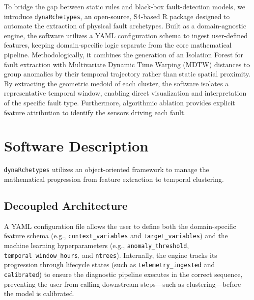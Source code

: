 \documentclass[final,3p,times]{elsarticle}
\begin{document}
To bridge the gap between static rules and black-box fault-detection models, we introduce \texttt{dynaRchetypes}, an open-source, S4-based R package designed to automate the extraction of physical fault archetypes. Built as a domain-agnostic engine, the software utilizes a YAML configuration schema to ingest user-defined features, keeping domain-specific logic separate from the core mathematical pipeline. Methodologically, it combines the generation of an Isolation Forest for fault extraction \cite{liu2008isolation} with Multivariate Dynamic Time Warping (MDTW) distances \cite{shokoohi2017generalizing} to group anomalies by their temporal trajectory rather than static spatial proximity. By extracting the geometric medoid of each cluster, the software isolates a representative temporal window, enabling direct visualization and interpretation of the specific fault type. Furthermore, algorithmic ablation provides explicit feature attribution to identify the sensors driving each fault.

\section{Software Description}

\texttt{dynaRchetypes} utilizes an object-oriented framework to manage the mathematical progression from feature extraction to temporal clustering.

\subsection{Decoupled Architecture}

A YAML configuration file allows the user to define both the domain-specific feature schema (e.g., \texttt{context\_variables} and \texttt{target\_variables}) and the machine learning hyperparameters (e.g., \texttt{anomaly\_threshold}, \texttt{temporal\_window\_hours}, and \texttt{ntrees}). Internally, the engine tracks its progression through lifecycle states (such as \texttt{telemetry\_ingested} and \texttt{calibrated}) to ensure the diagnostic pipeline executes in the correct sequence, preventing the user from calling downstream steps—such as clustering—before the model is calibrated.
\end{document}
